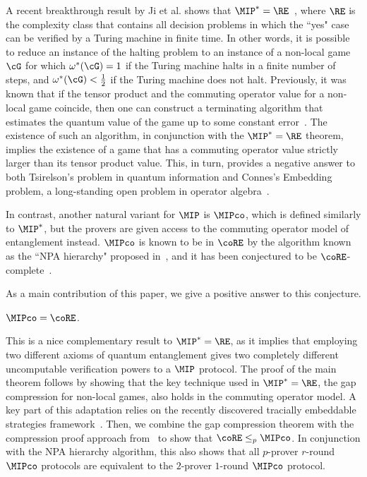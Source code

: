 A recent breakthrough result by Ji et al. shows that $\MIP^*=\RE$~\cite{jiMIPRE2022a}, where $\RE$ is the complexity class that contains all decision problems in which the ``yes" case can be verified by a Turing machine in finite time. In other words, it is possible to reduce an instance of the halting problem to an instance of a non-local game $\cG$ for which $\omega^{*}(\cG) = 1$ if the Turing machine halts in a finite number of steps, and $\omega^*(\cG) < \frac{1}{2}$ if the Turing machine does not halt. Previously, it was known that if the tensor product and the commuting operator value for a non-local game coincide, then one can construct a terminating algorithm that estimates the quantum value of the game up to some constant error~\cite{navascuesConvergentHierarchySemidefinite2008b}. The existence of such an algorithm, in conjunction with the $\MIP^*=\RE$ theorem, implies the existence of a game that has a commuting operator value strictly larger than its tensor product value. This, in turn, provides a negative answer to both Tsirelson's problem in quantum information and Connes's Embedding problem, a long-standing open problem in operator algebra~\cite{connesClassificationInjectiveFactors1976, ozawaConnesEmbeddingConjecture2013a}. 

In contrast, another natural variant for $\MIP$ is $\MIPco$, which is defined similarly to $\MIP^*$, but the provers are given access to the commuting operator model of entanglement instead. $\MIPco$ is known to be in $\coRE$ by the algorithm known as the ``NPA hierarchy" proposed in~\cite{navascuesConvergentHierarchySemidefinite2008b}, and it has been conjectured to be $\coRE$-complete~\cite[Section 1.4]{jiMIPRE2022a}. %

As a main contribution of this paper, we give a positive answer to this conjecture. 
\begin{theorem} \label{thm:MIPcocoRE}
	$\MIPco = \coRE$. 
\end{theorem}
This is a nice complementary result to $\MIP^* = \RE$, as it implies that employing two different axioms of quantum entanglement gives two completely different uncomputable verification powers to a $\MIP$ protocol. The proof of the main theorem follows by showing that the key technique used in $\MIP^*=\RE$, the gap compression for non-local games, also holds in the commuting operator model. A key part of this adaptation relies on the recently discovered tracially embeddable strategies framework~\cite{linTracialEmbeddableStrategies2024}. Then, we combine the gap compression theorem with the compression proof approach from~\cite[Section 1.1]{mousaviNonlocalGamesCompression2022} to show that $\coRE \leq_p \MIPco$. In conjunction with the NPA hierarchy algorithm, this also shows that all $p$-prover $r$-round $\MIPco$ protocols are equivalent to the $2$-prover $1$-round $\MIPco$ protocol. 

